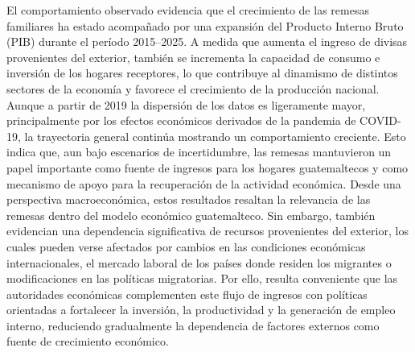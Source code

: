 El comportamiento observado evidencia que el crecimiento de las remesas familiares ha estado acompañado por una expansión del Producto Interno Bruto (PIB) durante el período 2015–2025. A medida que aumenta el ingreso de divisas provenientes del exterior, también se incrementa la capacidad de consumo e inversión de los hogares receptores, lo que contribuye al dinamismo de distintos sectores de la economía y favorece el crecimiento de la producción nacional.
Aunque a partir de 2019 la dispersión de los datos es ligeramente mayor, principalmente por los efectos económicos derivados de la pandemia de COVID-19, la trayectoria general continúa mostrando un comportamiento creciente. Esto indica que, aun bajo escenarios de incertidumbre, las remesas mantuvieron un papel importante como fuente de ingresos para los hogares guatemaltecos y como mecanismo de apoyo para la recuperación de la actividad económica.
Desde una perspectiva macroeconómica, estos resultados resaltan la relevancia de las remesas dentro del modelo económico guatemalteco. Sin embargo, también evidencian una dependencia significativa de recursos provenientes del exterior, los cuales pueden verse afectados por cambios en las condiciones económicas internacionales, el mercado laboral de los países donde residen los migrantes o modificaciones en las políticas migratorias. Por ello, resulta conveniente que las autoridades económicas complementen este flujo de ingresos con políticas orientadas a fortalecer la inversión, la productividad y la generación de empleo interno, reduciendo gradualmente la dependencia de factores externos como fuente de crecimiento económico.